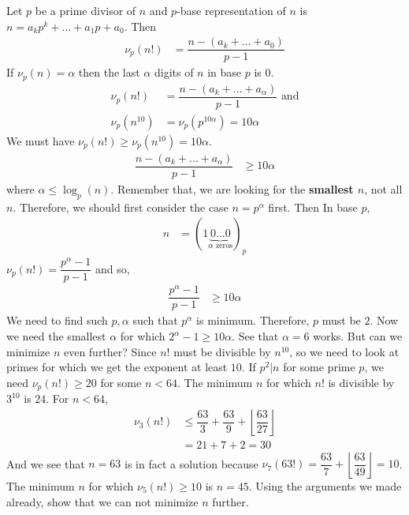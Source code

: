 \documentclass[problems.tex]{subfile}
\begin{document}
	\begin{solution}
		Let $p$ be a prime divisor of $n$ and $p$-base representation of $n$ is $n=a_kp^k+\ldots+a_1p+a_0$. Then
			\begin{align*}
				\nu_p(n!) & = \dfrac{n-(a_k+\ldots+a_0)}{p-1}
			\end{align*}
		If $\nu_p(n)=\alpha $ then the last $\alpha $ digits of $n$ in base $p$ is $0$.
			\begin{align*}
				\nu_p(n!) & = \dfrac{n-(a_k+\ldots+a_{\alpha })}{p-1}\text { and}\\
				\nu_p(n^{10}) & = \nu_p(p^{10\alpha })=10\alpha
			\end{align*}
		We must have $\nu_p(n!)\geq \nu_p(n^{10})=10\alpha$.
			\begin{align*}
				\dfrac{n-(a_k+\ldots+a_\alpha)}{p-1} & \geq10\alpha 
			\end{align*}
		where $\alpha\leq\log_p(n)$. Remember that, we are looking for the \textbf{smallest $n$}, not all $n$. Therefore, we should first consider the case $n=p^\alpha$ first. Then In base $p$,
			\begin{align*}
				n & = (1\underbrace{0\ldots0}_{\alpha\text { zeros}})_p
			\end{align*}
		$\nu_p(n!) = \dfrac{p^\alpha-1}{p-1}$ and so,	
			\begin{align*}
				\dfrac{p^\alpha-1}{p-1} &\geq10\alpha
			\end{align*}
		We need to find such $p,\alpha$ such that $p^\alpha$ is minimum. Therefore, $p$ must be $2$. Now we need the smallest $\alpha$ for which $2^\alpha-1\geq10\alpha $. See that $\alpha = 6$ works. But can we minimize $n$ even further? Since $n!$ must be divisible by $n^{10}$, so we need to look at primes for which we get the exponent at least $10$. If $p^2|n$ for some prime $p$, we need $\nu_p(n!)\geq20$ for some $n<64$. The minimum $n$ for which $n!$ is divisible by $3^{10}$ is $24$. For $n<64$,
			\begin{align*}
				\nu_3(n!) & \leq \dfrac{63}{3}+\dfrac{63}{9}+\left\lfloor\dfrac{63}{27}\right\rfloor\\
						  & = 21+7+2=30
			\end{align*}
		And we see that $n=63$ is in fact a solution because $\nu_7(63!) = \dfrac{63}{7}+\left\lfloor\dfrac{63}{49}\right\rfloor=10$. The minimum $n$ for which $\nu_5(n!)\geq10$ is $n=45$. Using the arguments we made already, show that we can not minimize $n$ further.
	\end{solution}
	
\end{document}
